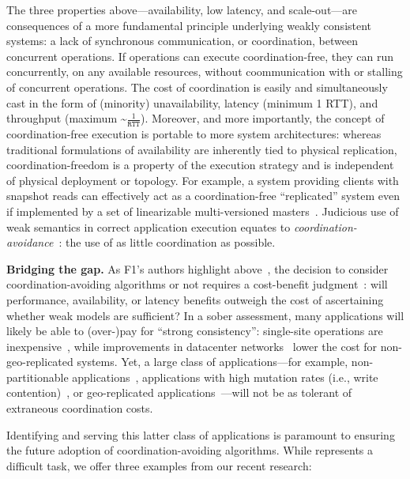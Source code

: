 \documentclass[9pt]{article}
\theoremstyle{definition}
\theoremstyle{remark}
\newcommand{\minihead}[1]{{\vspace{.4em}\noindent\textbf{#1.} }}
\begin{document}
The three properties above---availability, low latency, and scale-out---are consequences of a more fundamental principle underlying weakly consistent systems: a lack of synchronous communication, or coordination, between concurrent operations. If operations can execute coordination-free, they can run concurrently, on any available resources, without coommunication with or stalling of concurrent operations. The cost of coordination is easily and simultaneously cast in the form of (minority) unavailability, latency (minimum 1 RTT), and throughput (maximum \textasciitilde$\frac{1}{\texttt{RTT}}$). Moreover, and more importantly, the concept of coordination-free execution is portable to more system architectures: whereas traditional formulations of availability are inherently tied to physical replication, coordination-freedom is a property of the execution strategy and is independent of physical deployment or topology. For example, a system providing clients with snapshot reads can effectively act as a coordination-free ``replicated'' system even if implemented by a set of linearizable multi-versioned masters~\cite{ramp-txns}. Judicious use of weak semantics in correct application execution equates to \textit{coordination-avoidance}~\cite{coord-avoid}: the use of as little coordination as possible.

\minihead{Bridging the gap} As F1's authors highlight above~\cite{f1}, the decision to consider coordination-avoiding algorithms or not requires a cost-benefit judgment~\cite{queue}: will performance, availability, or latency benefits outweigh the cost of ascertaining whether weak models are sufficient? In a sober assessment, many applications will likely be able to (over-)pay for ``strong consistency'': single-site operations are inexpensive~\cite{sharednothing}, while improvements in datacenter networks~\cite{bobtail} lower the cost for non-geo-replicated systems. Yet, a large class of applications---for example, non-partitionable applications~\cite{tao}, applications with high mutation rates (i.e., write contention)~\cite{tpcc}, or geo-replicated applications~\cite{swift}---will not be as tolerant of extraneous coordination costs.

Identifying and serving this latter class of applications is paramount to ensuring the future adoption of coordination-avoiding algorithms. While represents a difficult task, we offer three examples from our recent research:
\end{document}
